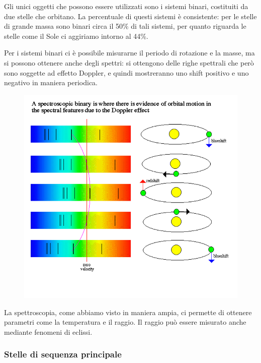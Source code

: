 Gli unici oggetti che possono essere utilizzati sono i sistemi binari, costituiti da due stelle che orbitano. La percentuale di questi sistemi è consistente: per le stelle di grande massa sono binari circa il 50\% di tali sistemi, per quanto riguarda le stelle come il Sole ci aggiriamo intorno al 44\%.

Per i sistemi binari ci è possibile misurarne il periodo di rotazione e la masse, ma si possono ottenere anche degli spettri: si ottengono delle righe spettrali che però sono soggette ad effetto Doppler, e quindi mostreranno uno shift positivo e uno negativo in maniera periodica.

\begin{figure}[H]
    \centering
    \includegraphics[scale=0.3]{doppler.png}
\end{figure}

La spettroscopia, come abbiamo visto in maniera ampia, ci permette di ottenere parametri come la temperatura e il raggio. Il raggio può essere misurato anche mediante fenomeni di eclissi.

\subsubsection{Stelle di sequenza principale}

